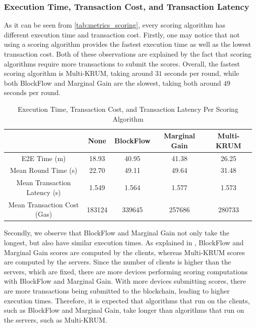 \subsubsection{Execution Time, Transaction Cost, and Transaction Latency}

As it can be seen from \autoref{tab:metrics_scoring}, every scoring algorithm has different execution time and transaction cost. Firstly, one may notice that not using a scoring algorithm provides the fastest execution time as well as the lowest transaction cost. Both of these observations are explained by the fact that scoring algorithms require more transactions to submit the scores. Overall, the fastest scoring algorithm is Multi-KRUM, taking around $31$ seconds per round, while both BlockFlow and Marginal Gain are the slowest, taking both around $49$ seconds per round.

\begin{table}[!ht]
\centering
\begin{tabular}{c|c|c|c|c} \hline \hline
                               & None   & BlockFlow & Marginal Gain & Multi-KRUM \\ \hline \hline
E2E Time (m)                   & 18.93  & 40.95     & 41.38         & 26.25      \\ \hline
Mean Round Time (s)            & 22.70  & 49.11     & 49.64         & 31.48      \\ \hline
Mean Transaction Latency (s)   & 1.549  & 1.564     & 1.577         & 1.573      \\ \hline
Mean Transaction Cost (Gas)    & 183124 & 339645    & 257686        & 280733     \\ \hline
\end{tabular}
\caption{Execution Time, Transaction Cost, and Transaction Latency Per Scoring Algorithm}
\label{tab:metrics_scoring}
\end{table}

Secondly, we observe that BlockFlow and Marginal Gain not only take the longest, but also have similar execution times. As explained in , BlockFlow and Marginal Gain scores are computed by the clients, whereas Multi-KRUM scores are computed by the servers. Since the number of clients is higher than the servers, which are fixed, there are more devices performing scoring computations with BlockFlow and Marginal Gain. With more devices submitting scores, there are more transactions being submitted to the blockchain, leading to higher execution times. Therefore, it is expected that algorithms that run on the clients, such as BlockFlow and Marginal Gain, take longer than algorithms that run on the servers, such as Multi-KRUM.

